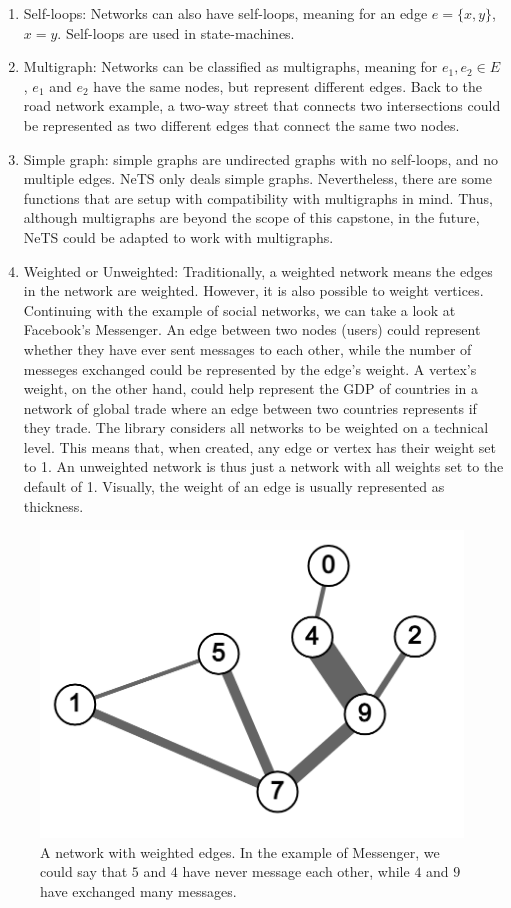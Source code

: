 \begin{enumerate}
  \item Self-loops: Networks can also have self-loops, meaning for an edge $e=\{x,y\}$, $x=y$.
  Self-loops are used in state-machines.
  \item Multigraph: Networks can be classified as multigraphs,
  meaning for $e_1,e_2\in E$, $e_1$ and $e_2$
  have the same nodes, but represent different edges. Back to the road network example, a two-way street that connects two
  intersections could be represented as two different edges that connect the same two nodes.
  \item Simple graph: simple graphs are undirected graphs with no self-loops, and no multiple edges.
  NeTS only deals simple graphs.
  Nevertheless, there are some functions that are setup with compatibility with
  multigraphs in mind. Thus, although multigraphs are beyond the scope of this capstone,
  in the future, NeTS could be adapted to work with multigraphs.
  \item Weighted or Unweighted: Traditionally, a weighted network means the edges in the network are weighted.
  However, it is also possible to weight vertices.
  Continuing with the example of social networks,
  we can take a look at Facebook's Messenger.
  An edge between two nodes (users) could represent
  whether they have ever sent messages to each other,
  while the number of messeges exchanged could
  be represented by the edge's weight.
  A vertex's weight, on the other hand,
  could help represent the GDP of countries in a
  network of global trade where an edge between
  two countries represents if they trade.
  The library considers all networks to be weighted on a technical level.
  This means that, when created, any edge or vertex has their weight set to 1.
  An unweighted network is thus just a network with all weights set to the default of 1.
  Visually, the weight of an edge is usually represented as thickness.
\end{enumerate}

\begin{figure}[H]
  \centering
  \includegraphics[scale=.25]{img/weighted_sample.png}
  \caption{A network with weighted edges. In the example of Messenger,
          we could say that $5$ and $4$ have never message each other,
          while $4$ and $9$ have exchanged many messages.}
  \label{fig:net_weight}
\end{figure}